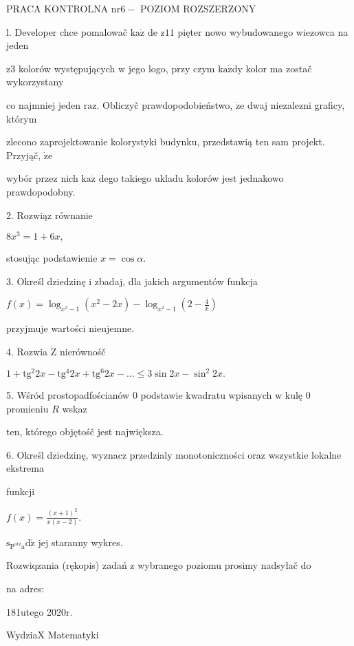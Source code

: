 \documentclass[a4paper,12pt]{article}
\begin{document}
PRACA KONTROLNA $\mathrm{n}\mathrm{r} 6-$ POZIOM ROZSZERZONY

l. Developer chce pomalowač $\mathrm{k}\mathrm{a}\dot{\mathrm{z}}$ de $\mathrm{z} 11$ pięter nowo wybudowanego wiezowca na jeden

$\mathrm{z}3$ kolorów występujących $\mathrm{w}$ jego logo, przy czym $\mathrm{k}\mathrm{a}\dot{\mathrm{z}}\mathrm{d}\mathrm{y}$ kolor ma zostač wykorzystany

co najmniej jeden $\mathrm{r}\mathrm{a}\mathrm{z}$. Obliczyč prawdopodobieństwo, $\dot{\mathrm{z}}\mathrm{e}$ dwaj niezalezni graficy, którym

zlecono zaprojektowanie kolorystyki budynku, przedstawią ten sam projekt. Przyjąč, $\dot{\mathrm{z}}\mathrm{e}$

wybór przez nich $\mathrm{k}\mathrm{a}\dot{\mathrm{z}}$ dego takiego ukladu kolorów jest jednakowo prawdopodobny.

2. Rozwiąz równanie

$8x^{3}=1+6x,$

stosując podstawienie $x=\cos\alpha.$

3. Określ dziedzinę $\mathrm{i}$ zbadaj, dla jakich argumentów funkcja

$f(x)=\displaystyle \log_{x^{2}-1}(x^{2}-2x)-\log_{x^{2}-1}(2-\frac{4}{x})$

przyjmuje wartości nieujemne.

4. Rozwia $\dot{\mathrm{Z}}$ nierównośč

$1+\mathrm{t}\mathrm{g}^{2}2x-\mathrm{t}\mathrm{g}^{4}2x+\mathrm{t}\mathrm{g}^{6}2x-\ldots\leq 3\sin 2x-\sin^{2}2x.$

5. Wśród prostopadfościanów $0$ podstawie kwadratu wpisanych $\mathrm{w}$ kulę $0$ promieniu $R$ wskaz

ten, którego objętośč jest największa.

6. Określ dziedzinę, wyznacz przedzialy monotoniczności oraz wszystkie lokalne ekstrema

funkcji

$f(x)=\displaystyle \frac{(x+1)^{2}}{x(x-2)}.$

$\mathrm{s}_{\mathrm{P}^{\mathrm{o}\mathrm{r}\mathrm{z}}\mathrm{a}}\mathrm{d}\acute{\mathrm{z}}$ jej staranny wykres.

Rozwiqzania (rękopis) zadań z wybranego poziomu prosimy nadsyłač do

na adres:

181utego 2020r.

WydziaX Matematyki
\end{document}
